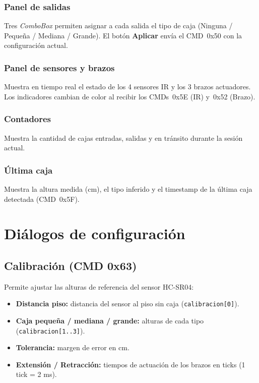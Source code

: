 \documentclass[12pt,a4paper]{report}
\begin{document}
\subsection{Panel de salidas}

Tres \textit{ComboBox} permiten asignar a cada salida el tipo de caja
(Ninguna / Pequeña / Mediana / Grande).  El botón \textbf{Aplicar} envía
el CMD~0x50 con la configuración actual.

\subsection{Panel de sensores y brazos}

Muestra en tiempo real el estado de los 4 sensores IR y los 3 brazos
actuadores.  Los indicadores cambian de color al recibir los CMDs~0x5E
(IR) y~0x52 (Brazo).

\subsection{Contadores}

Muestra la cantidad de cajas entradas, salidas y en tránsito durante la
sesión actual.

\subsection{Última caja}

Muestra la altura medida (cm), el tipo inferido y el timestamp de la
última caja detectada (CMD~0x5F).

\chapter{Diálogos de configuración}

\section{Calibración (CMD 0x63)}

Permite ajustar las alturas de referencia del sensor HC-SR04:

\begin{itemize}
  \item \textbf{Distancia piso:} distancia del sensor al piso sin caja (\texttt{calibracion[0]}).
  \item \textbf{Caja pequeña / mediana / grande:} alturas de cada tipo (\texttt{calibracion[1..3]}).
  \item \textbf{Tolerancia:} margen de error en cm.
  \item \textbf{Extensión / Retracción:} tiempos de actuación de los brazos en ticks (1 tick = 2 ms).
\end{itemize}
\end{document}
